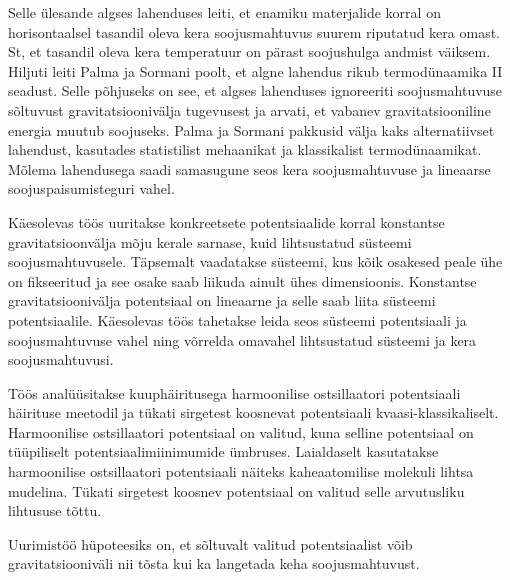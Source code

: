 \documentclass{trkut}%
\begin{document}
Selle ülesande algses lahenduses leiti, et enamiku materjalide korral on horisontaalsel tasandil oleva kera soojusmahtuvus suurem riputatud kera omast.
St, et tasandil oleva kera temperatuur on pärast soojushulga andmist väiksem.
Hiljuti leiti Palma ja Sormani poolt, et algne lahendus rikub termodünaamika II seadust.
Selle põhjuseks on see, et algses lahenduses ignoreeriti soojusmahtuvuse sõltuvust gravitatsioonivälja tugevusest ja arvati, et vabanev gravitatsiooniline energia muutub soojuseks.
Palma ja Sormani pakkusid välja kaks alternatiivset lahendust, kasutades statistilist mehaanikat ja klassikalist termodünaamikat.
Mõlema lahendusega saadi samasugune seos kera soojusmahtuvuse ja lineaarse soojuspaisumisteguri vahel. %

Käesolevas töös uuritakse konkreetsete potentsiaalide korral konstantse gravitatsioonvälja mõju kerale sarnase, kuid lihtsustatud süsteemi soojusmahtuvusele.
Täpsemalt vaadatakse süsteemi, kus kõik osakesed peale ühe on fikseeritud ja see osake saab liikuda ainult ühes dimensioonis.
Konstantse gravitatsioonivälja potentsiaal on lineaarne ja selle saab liita süsteemi potentsiaalile.
Käesolevas töös tahetakse leida seos süsteemi potentsiaali ja soojusmahtuvuse vahel ning võrrelda omavahel lihtsustatud süsteemi ja kera soojusmahtuvusi.

Töös analüüsitakse kuuphäiritusega harmoonilise ostsillaatori potentsiaali häirituse meetodil ja tükati sirgetest koosnevat potentsiaali kvaasi-klassikaliselt.
Harmoonilise ostsillaatori potentsiaal on valitud, kuna selline potentsiaal on tüüpiliselt potentsiaalimiinimumide ümbruses.
Laialdaselt kasutatakse harmoonilise ostsillaatori potentsiaali näiteks kaheaatomilise molekuli lihtsa mudelina.
Tükati sirgetest koosnev potentsiaal on valitud selle arvutusliku lihtususe tõttu.


Uurimistöö hüpoteesiks on, et sõltuvalt valitud potentsiaalist võib gravitatsiooniväli nii tõsta kui ka langetada keha soojusmahtuvust.
\end{document}
